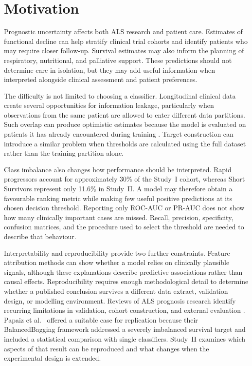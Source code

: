 \section{Motivation}
\label{subsec:motivation}

Prognostic uncertainty affects both ALS research and patient care. Estimates of functional decline can help stratify clinical trial cohorts and identify patients who may require closer follow-up. Survival estimates may also inform the planning of respiratory, nutritional, and palliative support. These predictions should not determine care in isolation, but they may add useful information when interpreted alongside clinical assessment and patient preferences.

The difficulty is not limited to choosing a classifier. Longitudinal clinical data create several opportunities for information leakage, particularly when observations from the same patient are allowed to enter different data partitions. Such overlap can produce optimistic estimates because the model is evaluated on patients it has already encountered during training \cite{Grollemund2019}. Target construction can introduce a similar problem when thresholds are calculated using the full dataset rather than the training partition alone.

Class imbalance also changes how performance should be interpreted. Rapid progressors account for approximately 30\% of the Study~I cohort, whereas Short Survivors represent only 11.6\% in Study~II. A model may therefore obtain a favourable ranking metric while making few useful positive predictions at its chosen decision threshold. Reporting only \gls{ROC-AUC} or \gls{PR-AUC} does not show how many clinically important cases are missed. Recall, precision, specificity, confusion matrices, and the procedure used to select the threshold are needed to describe that behaviour.

Interpretability and reproducibility provide two further constraints. Feature-attribution methods can show whether a model relies on clinically plausible signals, although these explanations describe predictive associations rather than causal effects. Reproducibility requires enough methodological detail to determine whether a published conclusion survives a different data extract, validation design, or modelling environment. Reviews of ALS prognosis research identify recurring limitations in validation, cohort construction, and external evaluation \cite{Papaiz2022,Tavazzi2023}. Papaiz et al.\ \cite{Papaiz2024} offered a suitable case for replication because their BalancedBagging framework addressed a severely imbalanced survival target and included a statistical comparison with single classifiers. Study~II examines which aspects of that result can be reproduced and what changes when the experimental design is extended.

